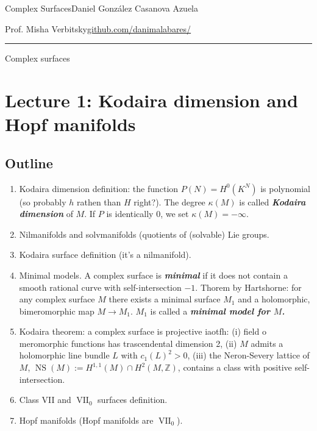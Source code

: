 
%




\begin{minipage}{\textwidth}
	\begin{minipage}{1\textwidth}
		 Complex Surfaces\hfill Daniel González Casanova Azuela
		
		{\small Prof. Misha Verbitsky\hfill\href{https://github.com/danimalabares/}{github.com/danimalabares/}}
	\end{minipage}
\end{minipage}\vspace{.2cm}\hrule

\vspace{10pt}
{\huge Complex surfaces}

\tableofcontents

\section{Lecture 1: Kodaira dimension and Hopf manifolds}

\subsection{Outline}
\begin{enumerate}
\item Kodaira dimension definition: the function \(P(N)=H^{0}(K^N)\) is polynomial (so probably \(h\) rathen than \(H\) right?). The degree  \(\kappa(M)\) is called \textit{\textbf{Kodaira dimension}} of \(M\). If \(P\) is identically 0, we set \(\kappa(M)=-\infty\).
\item Nilmanifolds and solvmanifolds (quotients of (solvable) Lie groups.
\item Kodaira surface definition (it's a nilmanifold).
\item Minimal models. A complex surface is \textit{\textbf{minimal}} if it does not contain a smooth rational curve with self-intersection \(-1\). Thorem by Hartshorne: for any complex surface \(M\) there exists a minimal surface \(M_1\) and a holomorphic, bimeromorphic map \(M \to M_1\). \(M_1\) is called a \textit{\textbf{minimal model for \(M\).}}
\item Kodaira theorem: a complex surface is projective iaotfh: (i) field o meromorphic functions has trascendental dimension 2, (ii)  \(M\) admits a holomorphic line bundle \(L\) with \(c_1(L)^2>0\), (iii) the Neron-Severy lattice of \(M\), \(\operatorname{NS}(M):=H^{1,1}(M)\cap H^{2}(M,\mathbb{Z})\), contains a class with positive self-intersection. 
\item Class VII and \(\operatorname{V I I}_0\) surfaces definition.
\item Hopf manifolds (Hopf manifolds are \(\operatorname{  V I I}_0\)).
\end{enumerate}

